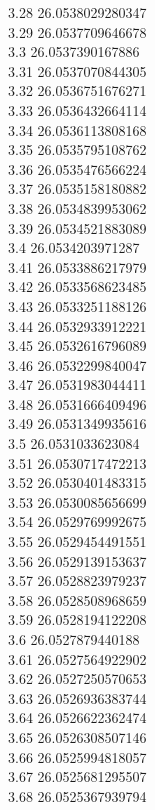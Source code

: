 {3.28	26.0538029280347\\
3.29	26.0537709646678\\
3.3	26.0537390167886\\
3.31	26.0537070844305\\
3.32	26.0536751676271\\
3.33	26.0536432664114\\
3.34	26.0536113808168\\
3.35	26.0535795108762\\
3.36	26.0535476566224\\
3.37	26.0535158180882\\
3.38	26.0534839953062\\
3.39	26.0534521883089\\
3.4	26.0534203971287\\
3.41	26.0533886217979\\
3.42	26.0533568623485\\
3.43	26.0533251188126\\
3.44	26.0532933912221\\
3.45	26.0532616796089\\
3.46	26.0532299840047\\
3.47	26.0531983044411\\
3.48	26.0531666409496\\
3.49	26.0531349935616\\
3.5	26.0531033623084\\
3.51	26.0530717472213\\
3.52	26.0530401483315\\
3.53	26.0530085656699\\
3.54	26.0529769992675\\
3.55	26.0529454491551\\
3.56	26.0529139153637\\
3.57	26.0528823979237\\
3.58	26.0528508968659\\
3.59	26.0528194122208\\
3.6	26.0527879440188\\
3.61	26.0527564922902\\
3.62	26.0527250570653\\
3.63	26.0526936383744\\
3.64	26.0526622362474\\
3.65	26.0526308507146\\
3.66	26.0525994818057\\
3.67	26.0525681295507\\
3.68	26.0525367939794\\
}
